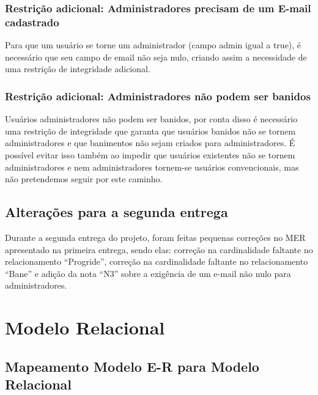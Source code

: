 \subsection{Restrição adicional: Administradores precisam de um E-mail cadastrado}

Para que um usuário se torne um administrador (campo admin igual a true), é
necessário que seu campo de email não seja nulo, criando assim a necessidade de
uma restrição de integridade adicional.

\subsection{Restrição adicional: Administradores não podem ser banidos}

Usuários administradores não podem ser banidos, por conta disso é necessário
uma restrição de integridade que garanta que usuários banidos não se tornem
administradores e que banimentos não sejam criados para administradores. É
possível evitar isso também ao impedir que usuários existentes não se tornem
administradores e nem administradores tornem-se usuários convencionais, mas não
pretendemos seguir por este caminho.


\section{Alterações para a segunda entrega}

Durante a segunda entrega do projeto, foram feitas pequenas correções no MER
apresentado na primeira entrega, sendo elas: correção na cardinalidade faltante
no relacionamento ``Progride'', correção na cardinalidade faltante no
relacionamento ``Bane'' e adição da nota ``N3'' sobre a exigência de um e-mail
não nulo para administradores.


\chapter{Modelo Relacional}

\section{Mapeamento Modelo E-R para Modelo Relacional}

